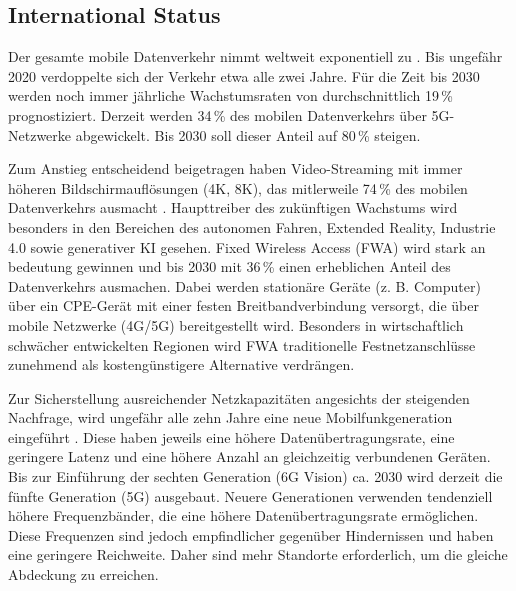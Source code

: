 \subsection{International Status}
\begin{German}
    Der gesamte mobile Datenverkehr nimmt weltweit exponentiell zu \cite{EricssonMobilityReport}. Bis ungefähr 2020 verdoppelte sich der Verkehr etwa alle zwei Jahre. Für die Zeit bis 2030 werden noch immer jährliche Wachstumsraten von durchschnittlich 19\,\% prognostiziert. Derzeit werden 34\,\% des mobilen Datenverkehrs über 5G-Netzwerke abgewickelt. Bis 2030 soll dieser Anteil auf 80\,\% steigen.

    Zum Anstieg entscheidend beigetragen haben Video-Streaming mit immer höheren Bildschirmauflösungen (4K, 8K), das mitlerweile 74\,\% des mobilen Datenverkehrs ausmacht \cite{EricssonMobilityReport}. Haupttreiber des zukünftigen Wachstums wird besonders in den Bereichen des autonomen Fahren, Extended Reality, Industrie 4.0 sowie generativer KI gesehen. 
    Fixed Wireless Access (FWA) wird stark an bedeutung gewinnen und bis 2030 mit 36\,\% einen erheblichen Anteil des Datenverkehrs ausmachen. Dabei werden stationäre Geräte (z. B. Computer) über ein CPE-Gerät mit einer festen Breitbandverbindung versorgt, die über mobile Netzwerke (4G/5G) bereitgestellt wird. Besonders in wirtschaftlich schwächer entwickelten Regionen wird FWA traditionelle Festnetzanschlüsse zunehmend als kostengünstigere Alternative verdrängen. \cite{EricssonMobilityReport}

    Zur Sicherstellung ausreichender Netzkapazitäten angesichts der steigenden Nachfrage, wird ungefähr alle zehn Jahre eine neue Mobilfunkgeneration eingeführt \cite{bundesratNachhaltigesMobilfunknetzBericht2022}. Diese haben jeweils eine höhere Datenübertragungsrate, eine geringere Latenz und eine höhere Anzahl an gleichzeitig verbundenen Geräten. Bis zur Einführung der sechten Generation (6G Vision) ca. 2030 wird derzeit die fünfte Generation (5G) ausgebaut. Neuere Generationen verwenden tendenziell höhere Frequenzbänder, die eine höhere Datenübertragungsrate ermöglichen. Diese Frequenzen sind jedoch empfindlicher gegenüber Hindernissen und haben eine geringere Reichweite. Daher sind mehr Standorte erforderlich, um die gleiche Abdeckung zu erreichen. \cite{bundesratNachhaltigesMobilfunknetzBericht2022}
\end{German}

